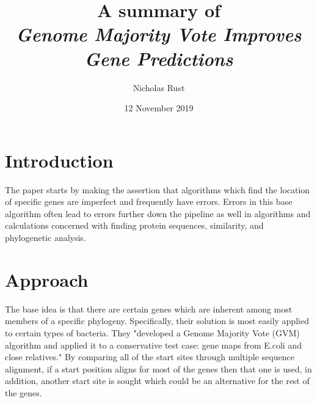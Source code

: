 \documentclass{article}
\title{A summary of\\ \textit{Genome Majority Vote Improves Gene Predictions}\cite{Geno2011}}
\author{Nicholas Rust}
\date{12 November 2019}
\begin{document}
\maketitle

\section{Introduction}
The paper starts by making the assertion that algorithms which find the location of specific genes are imperfect and frequently have errors. Errors in this base algorithm often lead to errors further down the pipeline as well in algorithms and calculations concerned with finding protein sequences, similarity, and phylogenetic analysis.

\section{Approach}
The base idea is that there are certain genes which are inherent among most members of a specific phylogeny. Specifically, their solution is most easily applied to certain types of bacteria. They "developed a Genome Majority Vote (GVM) algorithm and applied it to a conservative test case: gene maps from E.coli and close relatives." By comparing all of the start sites through multiple sequence alignment, if a start position aligns for most of the genes then that one is used, in addition, another start site is sought which could be an alternative for the rest of the genes.



\end{document}
